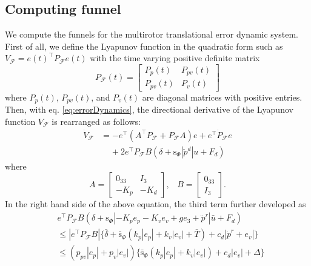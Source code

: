 \documentclass[letterpaper, 10 pt, conference]{ieeeconf}  %
\begin{document}
\subsection{Computing funnel}
We compute the funnels for the multirotor translational error dynamic system.
First of all, 
we define the Lyapunov function in the quadratic form such as $V_\mathcal{F} = e(t)^\top P_\mathcal{F} e(t)$ with the time varying positive definite matrix
\begin{equation}
P_\mathcal{F}(t) = \left[
\begin{array}{cc}
P_p(t) & P_{pv}(t) \\
P_{pv}(t) & P_v(t)
\end{array}
\right] \nonumber
\end{equation}
where $P_p(t)$, $P_{pv}(t)$, and $P_v(t)$ are diagonal matrices with positive entries.
Then, with eq. \eqref{eq:errorDynamics}, the directional derivative of the Lyapunov function $V_\mathcal{F}$ is rearranged as follows: 
\begin{align}
\dot{V}_\mathcal{F} &= -e^\top ( A^\top P_\mathcal{F} + P_\mathcal{F}A) e + e^\top \dot{P}_\mathcal{F}e \nonumber \\
&\;\;\;\;+2e^\top P_\mathcal{F} B(\delta+\text{s}_\Phi|\ddot{p}^d|{u}+F_d) \nonumber
\end{align}
where
\begin{equation}
A = \left[
\begin{array}{rr}
0_{33} & I_3 \\ -K_p & -K_d 
\end{array}
\right],\;\;\;B = \left[
\begin{array}{r}
0_{33} \\ I_3
\end{array}
\right].\nonumber 
\end{equation}
In the right hand side of the above equation, the third term further developed as
\begin{align}
&e^\top P_\mathcal{F} B(\delta+\text{s}_\Phi|-K_p e_p -K_v e_v + ge_3 + \ddot{p}^r|\bar{u}+F_d) \nonumber \\
&\leq |e^\top P_\mathcal{F}B|\{\bar{\delta} + \bar{\text{s}}_\Phi(k_p|e_p| + k_v|e_v| + \bar{T})+c_d|\dot{p}^r+e_v|\} \nonumber \\
&\leq (p_{pv}|e_p|+p_v|e_v|)\{\bar{\text{s}}_\Phi(k_p|e_p|+k_v|e_v|)+c_d|e_v|+\Delta\} \label{eq:normAnalysis}
\end{align}
\end{document}
